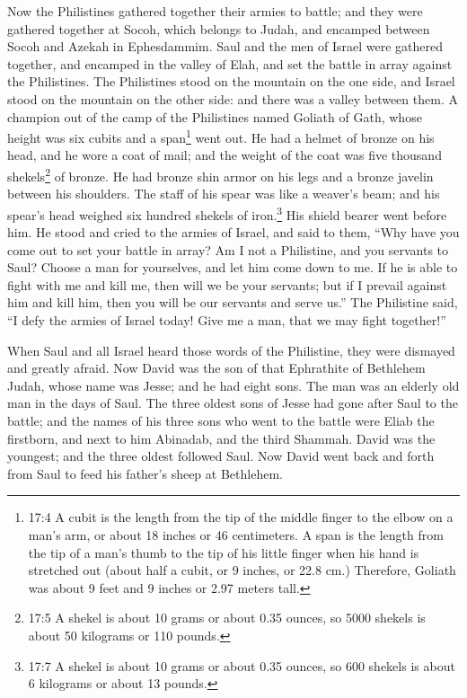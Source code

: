 \mychapter{} \myverse*{}Now the Philistines gathered together their armies to battle;
and they were gathered together at Socoh, which belongs to Judah, and encamped between Socoh and Azekah
in Ephesdammim.
\myverse{}Saul and the men of Israel were gathered together, and encamped in the valley
of Elah, and set the battle in array against the Philistines.
\myverse{}The Philistines stood on the mountain on the one side, and Israel stood on
the mountain on the other side: and there was a valley between them.
\myverse{}A champion out of the camp of the Philistines named Goliath of Gath, whose
height was six cubits and a span\footnote{17:4 A cubit is the length from the tip of the middle finger to the elbow on a man’s arm, or about
	18 inches or 46 centimeters. A span is the length from the tip of a man’s thumb to the tip of his little
	finger when his hand is stretched out (about half a cubit, or 9 inches, or 22.8 cm.) Therefore, Goliath
	was about 9 feet and 9 inches or 2.97 meters tall.} went out.
\myverse{}He had a helmet of bronze on his head, and he wore a coat of mail; and the
weight of the coat was five thousand shekels\footnote{17:5 A shekel is about 10 grams or about 0.35 ounces, so 5000 shekels is about 50 kilograms or 110
	pounds.} of bronze.
\myverse{}He had bronze shin armor on his legs and a bronze javelin between his shoulders.
\myverse{}The staff of his spear was like a weaver’s beam; and his spear’s head weighed
six hundred shekels of iron.\footnote{17:7 A shekel is about 10 grams or about 0.35 ounces, so 600 shekels is about 6 kilograms or about
	13 pounds.} His shield bearer went before him.
\myverse{}He stood and cried to the armies of Israel, and said to them, “Why have you
come out to set your battle in array? Am I not a Philistine, and you servants to Saul? Choose a man for
yourselves, and let him come down to me.
\myverse{}If he is able to fight with me and kill me, then will we be your servants;
but if I prevail against him and kill him, then you will be our servants and serve us.”
\myverse{}The Philistine said, “I defy the armies of Israel today! Give me a man, that
we may fight together!”

\myverse{}When Saul and all Israel heard those words of the Philistine,
they were dismayed and greatly afraid.
\myverse{}Now David was the son of that Ephrathite of Bethlehem Judah, whose name was
Jesse; and he had eight sons. The man was an elderly old man in the days of Saul.
\myverse{}The three oldest sons of Jesse had gone after Saul to the battle; and the
names of his three sons who went to the battle were Eliab the firstborn, and next to him Abinadab, and
the third Shammah.
\myverse{}David was the youngest; and the three oldest followed Saul.
\myverse{}Now David went back and forth from Saul to feed his father’s sheep at Bethlehem.

